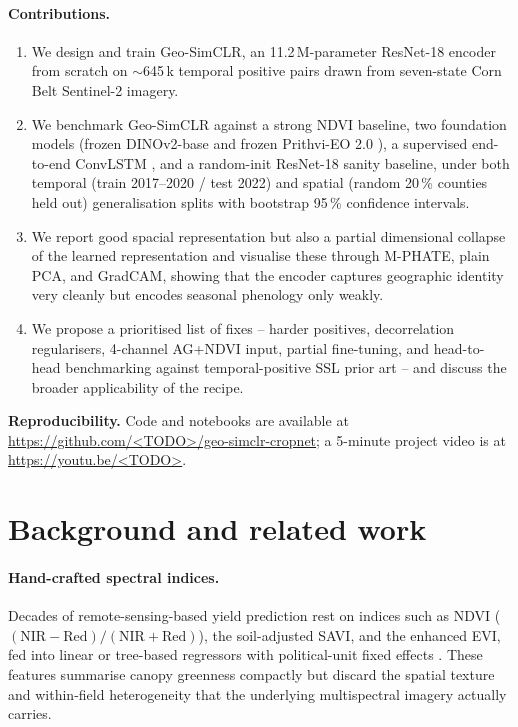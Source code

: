 \documentclass{article}
\begin{document}
\paragraph{Contributions.}
\begin{enumerate}\itemsep0pt
\item We design and train Geo-SimCLR, an 11.2\,M-parameter ResNet-18 encoder
      from scratch on $\sim$645\,k temporal positive pairs drawn from
      seven-state Corn Belt Sentinel-2 imagery.
\item We benchmark Geo-SimCLR against a strong NDVI baseline, two foundation
      models (frozen DINOv2-base \citep{oquab2024dinov2} and frozen Prithvi-EO
      2.0 \citep{jakubik2023prithvi}), a supervised end-to-end ConvLSTM
      \citep{shi2015convlstm}, and a random-init ResNet-18 sanity baseline,
      under both temporal (train 2017--2020 / test 2022) and spatial (random
      20\,\% counties held out) generalisation splits with bootstrap 95\,\%
      confidence intervals.
\item We report good spacial representation but also a partial dimensional collapse of the learned representation and visualise these through M-PHATE, plain PCA, and GradCAM, showing that the encoder captures geographic identity very cleanly but encodes seasonal phenology only weakly.
\item We propose a prioritised list of fixes -- harder positives, decorrelation
      regularisers, 4-channel AG+NDVI input, partial fine-tuning, and
      head-to-head benchmarking against temporal-positive SSL prior art -- and
      discuss the broader applicability of the recipe.
\end{enumerate}

\noindent\textbf{Reproducibility.} Code and notebooks are available at
\url{https://github.com/<TODO>/geo-simclr-cropnet}; a 5-minute project video is
at \url{https://youtu.be/<TODO>}.

\section{Background and related work}
\label{sec:related}

\paragraph{Hand-crafted spectral indices.}
Decades of remote-sensing-based yield prediction rest on indices such as NDVI
($(\mathrm{NIR}-\mathrm{Red})/(\mathrm{NIR}+\mathrm{Red})$), the soil-adjusted
SAVI, and the enhanced EVI, fed into linear or tree-based regressors with
political-unit fixed effects \citep{tucker1979ndvi,khaki2020cnnrnn}.
These features summarise canopy greenness compactly but discard the spatial
texture and within-field heterogeneity that the underlying multispectral
imagery actually carries.
\end{document}
